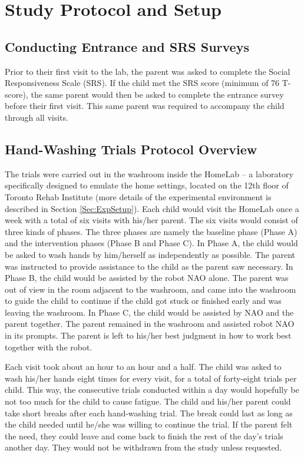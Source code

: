 \section{Study Protocol and Setup}
\label{sec:StudyProtocol}

\subsection{Conducting Entrance and SRS Surveys}
Prior to their first visit to the lab, the parent was asked to complete the Social Responsiveness Scale (SRS). If the child met the SRS score (minimum of 76 T-score), the same parent would then be asked to complete the entrance survey before their first visit. This same parent was required to accompany the child through all visits.


\subsection{Hand-Washing Trials Protocol Overview}
\label{sec:ProtocolOverview}
The trials were carried out in the washroom inside the HomeLab -- a laboratory specifically designed to emulate the home settings, located on the 12th floor of Toronto Rehab Institute (more details of the experimental environment is described in Section \ref{Sec:ExpSetup}).  Each child would visit the HomeLab once a week with a total of six visits with his/her parent. The six visits would consist of three kinds of phases. The three phases are namely the baseline phase (Phase A) and the intervention phases (Phase B and Phase C). In Phase A, the child would be asked to wash hands by him/herself as independently as possible. The parent was instructed to provide assistance to the child as the parent saw necessary.  In Phase B, the child would be assisted by the robot NAO alone.  The parent was out of view in the room adjacent to the washroom, and came into the washroom to guide the child to continue if the child got stuck or finished early and was leaving the washroom.  In Phase C, the child would be assisted by NAO and the parent together.  The parent remained in the washroom and assisted robot NAO in its prompts.  The parent is left to his/her best judgment in how to work best together with the robot.

Each visit took about an hour to an hour and a half. The child was asked to wash his/her hands eight times for every visit, for a total of forty-eight trials per child.  This way, the consecutive trials conducted within a day would hopefully be not too much for the child to cause fatigue.  The child and his/her parent could take short breaks after each hand-washing trial.  The break could last as long as the child needed until he/she was willing to continue the trial. If the parent felt the need, they could leave and come back to finish the rest of the day's trials another day. They would not be withdrawn from the study unless requested.

